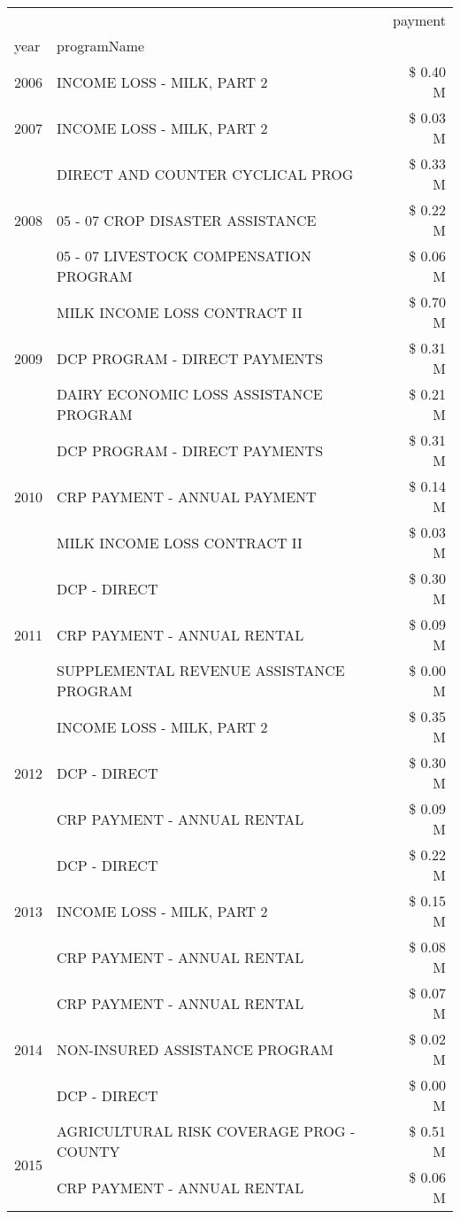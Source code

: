 \begin{tabular}{llr}
\toprule
 &  & payment \\
year & programName &  \\
\midrule
2006 & INCOME LOSS - MILK, PART 2 & \$ 0.40 M \\
\cline{1-3}
2007 & INCOME LOSS - MILK, PART 2 & \$ 0.03 M \\
\cline{1-3}
\multirow[t]{3}{*}{2008} & DIRECT AND COUNTER CYCLICAL PROG & \$ 0.33 M \\
 & 05 - 07 CROP DISASTER ASSISTANCE & \$ 0.22 M \\
 & 05 - 07 LIVESTOCK COMPENSATION PROGRAM & \$ 0.06 M \\
\cline{1-3}
\multirow[t]{3}{*}{2009} & MILK INCOME LOSS CONTRACT II & \$ 0.70 M \\
 & DCP PROGRAM - DIRECT PAYMENTS & \$ 0.31 M \\
 & DAIRY ECONOMIC LOSS ASSISTANCE PROGRAM & \$ 0.21 M \\
\cline{1-3}
\multirow[t]{3}{*}{2010} & DCP PROGRAM - DIRECT PAYMENTS & \$ 0.31 M \\
 & CRP PAYMENT - ANNUAL PAYMENT & \$ 0.14 M \\
 & MILK INCOME LOSS CONTRACT II & \$ 0.03 M \\
\cline{1-3}
\multirow[t]{3}{*}{2011} & DCP - DIRECT & \$ 0.30 M \\
 & CRP PAYMENT - ANNUAL RENTAL & \$ 0.09 M \\
 & SUPPLEMENTAL REVENUE ASSISTANCE PROGRAM & \$ 0.00 M \\
\cline{1-3}
\multirow[t]{3}{*}{2012} & INCOME LOSS - MILK, PART 2 & \$ 0.35 M \\
 & DCP - DIRECT & \$ 0.30 M \\
 & CRP PAYMENT - ANNUAL RENTAL & \$ 0.09 M \\
\cline{1-3}
\multirow[t]{3}{*}{2013} & DCP - DIRECT & \$ 0.22 M \\
 & INCOME LOSS - MILK, PART 2 & \$ 0.15 M \\
 & CRP PAYMENT - ANNUAL RENTAL & \$ 0.08 M \\
\cline{1-3}
\multirow[t]{3}{*}{2014} & CRP PAYMENT - ANNUAL RENTAL & \$ 0.07 M \\
 & NON-INSURED ASSISTANCE PROGRAM & \$ 0.02 M \\
 & DCP - DIRECT & \$ 0.00 M \\
\cline{1-3}
\multirow[t]{3}{*}{2015} & AGRICULTURAL RISK COVERAGE PROG - COUNTY & \$ 0.51 M \\
 & CRP PAYMENT - ANNUAL RENTAL & \$ 0.06 M \\

\end{tabular}
